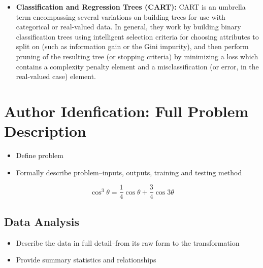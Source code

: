 \documentclass[fleqn,10pt]{SelfArx} %
\begin{document}
\begin{itemize}
	\item{\textbf{Classification and Regression Trees (CART):}} CART is an umbrella term encompassing several variations on building trees for use with categorical or real-valued data.  In general, they work by building binary classification trees using intelligent selection criteria for choosing attributes to split on (such as information gain or the Gini impurity), and then perform pruning of the resulting tree (or stopping criteria) by minimizing a loss which contains a complexity penalty element and a misclassification (or error, in the real-valued case) element.
\end{itemize}




%
%   
\section{Author Idenfication: Full Problem Description}
\begin{itemize}[noitemsep]
\item Define problem
\item Formally describe problem--inputs, outputs, training and testing method
\end{itemize}


\lipsum[4] %

\begin{equation}
\cos^3 \theta =\frac{1}{4}\cos\theta+\frac{3}{4}\cos 3\theta
\label{eq:refname2}
\end{equation}

\lipsum[5] %


\subsection{Data Analysis}
\begin{itemize}[noitemsep]
\item Describe the data in full detail--from its raw form to the transformation
\item Provide summary statistics and relationships
\end{itemize}
\end{document}
